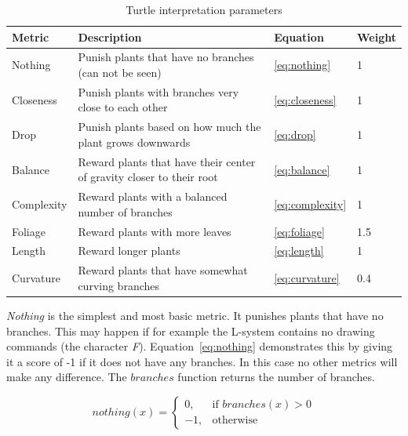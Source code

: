 \begin{table}
    \centering
    \begin{tabularx}{\textwidth}{| l | X | l | l |}
    \hline
    \textbf{Metric} & \textbf{Description} & \textbf{Equation} & \textbf{Weight} \\
    \hline
    Nothing & Punish plants that have no branches (can not be seen) & \ref{eq:nothing} & 1 \\
    \hline
    Closeness & Punish plants with branches very close to each other & \ref{eq:closeness} & 1 \\
    \hline
    Drop & Punish plants based on how much the plant grows downwards & \ref{eq:drop} & 1 \\
    \hline
    Balance & Reward plants that have their center of gravity closer to their root & \ref{eq:balance} & 1 \\
    \hline
    Complexity & Reward plants with a balanced number of branches & \ref{eq:complexity} & 1 \\
    \hline
    Foliage & Reward plants with more leaves & \ref{eq:foliage} & 1.5 \\
    \hline
    Length & Reward longer plants & \ref{eq:length} & 1 \\
    \hline
    Curvature & Reward plants that have somewhat curving branches & \ref{eq:curvature} & 0.4 \\
    \hline
    \end{tabularx}
    \caption[]{Turtle interpretation parameters}
    \label{tab:turtle-param}
\end{table}

\textit{Nothing} is the simplest and most basic metric.
It punishes plants that have no branches.
This may happen if for example the L-system contains no drawing commands (the character \textit{F}).
Equation~\ref{eq:nothing} demonstrates this by giving it a score of -1 if it does not have any branches.
In this case no other metrics will make any difference.
The $branches$ function returns the number of branches.

\begin{equation}
\label{eq:nothing}
    nothing(x) =
    \begin{cases}
        0,& \text{if } branches(x) > 0  \\
        -1,& \text{otherwise}
    \end{cases}
\end{equation}

